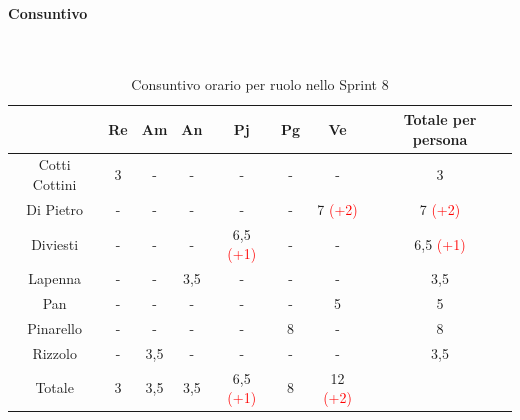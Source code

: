 \documentclass{article}
\begin{document}
                \paragraph{Consuntivo}\mbox{}\\
                \begin{table}[H]
                    \centering
                    \begin{tabular}{|c|c|c|c|c|c|c|c|}
                    \hline
                                    & Re  & Am  & An  & Pj  & Pg  & Ve  & Totale per persona \\ \hline
                    Cotti Cottini & 3   & -   & -   & -   & -   & -   & 3                  \\ \hline
                    Di Pietro     & -   & -   & -   & -   & -   & 7 \textcolor{red}{(+2)}   & 7 \textcolor{red}{(+2)}                  \\ \hline
                    Diviesti      & -   & -   & -   & 6,5 \textcolor{red}{(+1)} & -   & -   & 6,5 \textcolor{red}{(+1)}                \\ \hline
                    Lapenna       & -   & -   & 3,5 & -   & -   & -   & 3,5                \\ \hline
                    Pan           & -   & -   & -   & -   & -   & 5   & 5                  \\ \hline
                    Pinarello     & -   & -   & -   & -   & 8  & -   & 8                 \\ \hline
                    Rizzolo       & -   & 3,5 & -   & -   & -   & -   & 3,5                \\ \hline
                    Totale        & 3   & 3,5 & 3,5 & 6,5 \textcolor{red}{(+1)} & 8  & 12 \textcolor{red}{(+2)}  &                    \\ \hline
                    \end{tabular}
                    \caption{Consuntivo orario per ruolo nello Sprint 8}
                \end{table}

\end{document}
